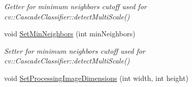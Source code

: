\begin{DoxyCompactItemize}
\begin{DoxyCompactList}\small\item\em Getter for minimum neighbors cutoff used for cv\-::\-Cascade\-Classifier\-::detect\-Multi\-Scale() \end{DoxyCompactList}\item 
\hypertarget{class_face_tracker_a24bd4d7e91a493c966650fd26387dd55}{void \hyperlink{class_face_tracker_a24bd4d7e91a493c966650fd26387dd55}{Set\-Min\-Neighbors} (int min\-Neighbors)}\label{class_face_tracker_a24bd4d7e91a493c966650fd26387dd55}

\begin{DoxyCompactList}\small\item\em Setter for minimum neighbors cutoff used for cv\-::\-Cascade\-Classifier\-::detect\-Multi\-Scale() \end{DoxyCompactList}\item 
\hypertarget{class_face_tracker_abd852b1cc6fe2f7658b7dd3cfd39db26}{void \hyperlink{class_face_tracker_abd852b1cc6fe2f7658b7dd3cfd39db26}{Set\-Processing\-Image\-Dimensions} (int width, int height)}\label{class_face_tracker_abd852b1cc6fe2f7658b7dd3cfd39db26}


\end{DoxyCompactItemize}
